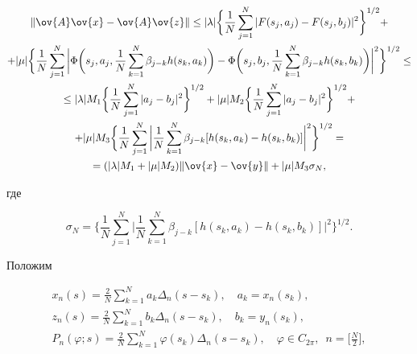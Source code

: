 \begin{multline}


\|\ov{A}\ov{x}-\ov{A}\ov{z}\|\leq |\lambda|


\biggl\{ \frac{1}{N}\sum_{j=1}^N|F(s_j,a_j)-F(s_j,b_j)|^2\biggr\}^{1/2}+\\


%


+|\mu|\biggl\{\frac{1}{N}\sum_{j=1}^N\bigg|\Phi\bigg(s_j,a_j,


\frac{1}{N}\sum_{k=1}^N\beta_{j-k}h(s_k,a_k)\bigg)-


\Phi\bigg(s_j,b_j,\frac{1}{N}\sum_{k=1}^N\beta_{j-k}h(s_k,b_k)\bigg)\bigg|^2


\biggr\}^{1/2}\leq \\


%


\leq |\lambda| M_1\biggl\{\frac{1}{N}\sum_{j=1}^N|a_j-b_j|^2


\biggr\}^{1/2}+|\mu| M_2\biggl\{\frac{1}{N}\sum_{j=1}^N|a_j-b_j|^2


\biggr\}^{1/2}+ \\


%


+|\mu| M_3\biggl\{\frac{1}{N}\sum_{j=1}^N\bigg|\frac{1}{N}\sum_{k=1}^N


\beta_{j-k}[h(s_k,a_k)-h(s_k,b_k)]\bigg|^2\bigg\}^{1/2}= \\


%


=(|\lambda| M_1+|\mu| M_2) \|\ov{x}-\ov{y}\|+


|\mu| M_3\sigma_N,


\end{multline}


где


\begin{equation}


\sigma_N=\biggl\{\frac{1}{N}\sum_{j=1}^N\bigg|\frac{1}{N}\sum_{k=1}^N


\beta_{j-k}[h(s_k,a_k)- h(s_k,b_k)]\bigg|^2\biggr\}^{1/2}.


\end{equation}


Положим


\begin{gather}


x_n(s)=\frac{2}{N}\sum_{k=1}^N a_k\Delta_n(s-s_k),\quad a_k=x_n(s_k), \\


%


z_n(s)=\frac{2}{N}\sum_{k=1}^N b_k\Delta_n(s-s_k),\quad b_k=y_n(s_k), \\


%


P_n(\varphi;s)=\frac{2}{N}\sum_{k=1}^N\varphi(s_k)\Delta_n(s-s_k),\quad


\varphi\in C_{2\pi},\ \; n=\pmb{\bigg [}\frac{N}{2}\pmb{\bigg ]},


\end{gather}


